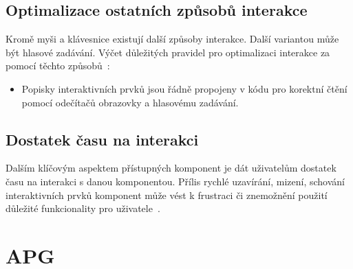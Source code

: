 \subsection{Optimalizace ostatních způsobů interakce}


Kromě myši a klávesnice existují další způsoby interakce.
Další variantou může být hlasové zadávání.
Výčet důležitých pravidel pro optimalizaci interakce za pomocí těchto způsobů~\cite{w3-accessibility-principles}:

\begin{itemize}
    \item Popisky interaktivních prvků jsou řádně propojeny v kódu pro korektní čtění pomocí odečítačů obrazovky a hlasovému zadávání.
\end{itemize}

\subsection{Dostatek času na interakci}

Dalším klíčovým aspektem přístupných komponent je dát uživatelům dostatek času na interakci s danou komponentou.
Přílis rychlé uzavírání, mizení, schování interaktivních prvků komponent může vést k frustraci či znemožnění použití důležité funkcionality pro uživatele~\cite{w3-accessibility-principles}.

\section{APG}


